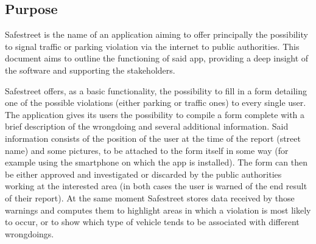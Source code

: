 




\subsection{Purpose}

Safestreet is the name of an application aiming to offer principally the possibility to signal traffic or parking violation via the internet to public authorities.
This document aims to outline the functioning of said app, providing a deep insight of the software and supporting the stakeholders.

Safestreet offers, as a basic functionality, the possibility to fill in a form detailing one of the possible violations (either parking or traffic ones) to every single user. The application gives its users the possibility to compile a form complete with a brief description of the wrongdoing and several additional information. Said information consists of the position of the user at the time of the report (street name) and some pictures, to be attached to the form itself in some way (for example using the smartphone on which the app is installed). The form can then be either approved and investigated or discarded by the public authorities working at the interested area (in both cases the user is warned of the end result of their report). At the same moment Safestreet stores data received by those warnings and computes them to highlight areas in which a violation is most likely to occur, or to show which type of vehicle tends to be associated with different wrongdoings.

